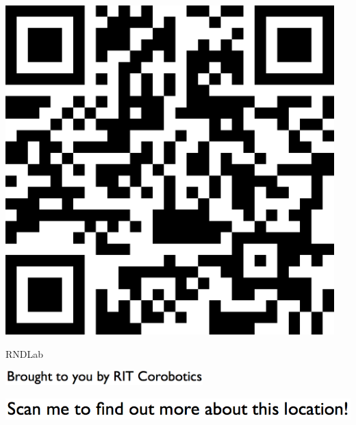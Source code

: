 \documentclass[letterpaper]{article}
\begin{document}
 \begingroup 
 \centerline{\includegraphics[scale=1,width=5in,height=5in]{RNDLab.png}} 
 \endgroup 
 \vspace*{\fill} 

 \hfill{\small RNDLab} 

  \vspace{0.7in} 
 
 \centerline{\includegraphics[scale=1,width=3in]{text-bottom.png}} 
 
 \pagebreak 
{} 
 \vspace*{\fill} 
 
  \centerline{\includegraphics[scale=1,width=6in]{text-top.png}} 
 
 \vspace{0.5in} 
 
\end{document}
